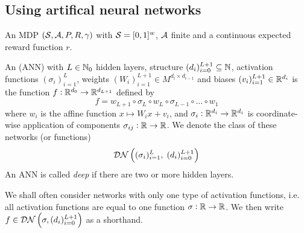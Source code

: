\subsection{Using artifical neural networks}

\begin{sett}
  An MDP $(\mathcal{S}, \mathcal{A}, P, R, \gamma)$ with
  $\mathcal{S} = [0,1]^w$, $\mathcal{A}$ finite and
  a continuous expected reward function $r$.
  \label{sett:annApprox}
\end{sett}

\begin{defn}
  An  (ANN) with $L \in \mathbb{N}_0$
  hidden layers, structure
  $(d_i)_{i=0}^{L+1} \subseteq \mathbb{N}$,
  activation functions $(\sigma_i)_{i=1}^L$,
  weights $(W_i)_{i=1}^{L+1} \in M^{d_i \times d_{i-1}}$ and
  biases $(v_i)_{i=1}^{L+1} \in \mathbb{R}^{d_i}$
  is the function $f:\mathbb{R}^{d_0} \to \mathbb{R}^{d_{L+1}}$ defined by
  \[ f = w_{L+1} \circ \sigma_L \circ w_L
  \circ \sigma_{L-1} \circ \dots \circ w_1 \]
  where $w_i$ is the affine function $x \mapsto W_i x + v_i$,
  and $\sigma_i : \mathbb{R}^{d_i} \to \mathbb{R}^{d_i}$ is coordinate-wise
  application of components $\sigma_{ij} : \mathbb{R} \to \mathbb{R}$.
  We denote the class of these networks (or functions)
  \[ \mathcal{DN} \left( (\sigma_i)_{i=1}^L,\; (d_i)_{i=0}^{L+1} \right) \]
  An ANN is called \emph{deep} if there are two or more hidden layers.
  \label{defn:ann}
\end{defn}

We shall often consider networks with only one type of activation functions,
i.e. all activation functions are equal to one function $\sigma: \mathbb{R} \to \mathbb{R}$.
We then write $f \in \mathcal{DN}\left(\sigma, (d_i)_{i=0}^{L+1} \right)$ as a
shorthand.

